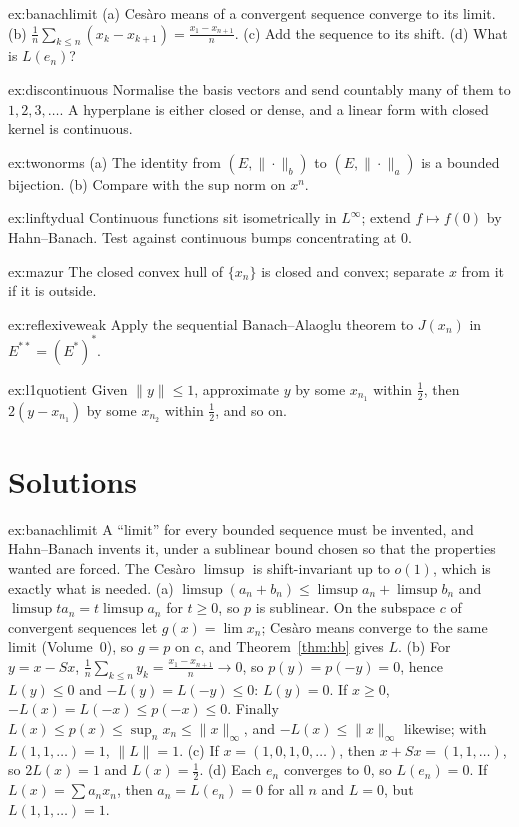 \begin{hint}{ex:banachlimit}
(a) Ces\`aro means of a convergent sequence converge to its limit. (b) $\frac1n\sum_{k\le n}(x_k-x_{k+1})=\frac{x_1-x_{n+1}}n$. (c) Add the sequence to its shift. (d) What is $L(e_n)$?
\end{hint}
\begin{hint}{ex:discontinuous}
Normalise the basis vectors and send countably many of them to $1,2,3,\dots$. A hyperplane is either closed or dense, and a linear form with closed kernel is continuous.
\end{hint}
\begin{hint}{ex:twonorms}
(a) The identity from $(E,\|\cdot\|_b)$ to $(E,\|\cdot\|_a)$ is a bounded bijection. (b) Compare with the sup norm on $x^n$.
\end{hint}
\begin{hint}{ex:linftydual}
Continuous functions sit isometrically in $L^\infty$; extend $f\mapsto f(0)$ by Hahn--Banach. Test against continuous bumps concentrating at $0$.
\end{hint}
\begin{hint}{ex:mazur}
The closed convex hull of $\{x_n\}$ is closed and convex; separate $x$ from it if it is outside.
\end{hint}
\begin{hint}{ex:reflexiveweak}
Apply the sequential Banach--Alaoglu theorem to $J(x_n)$ in $E^{**}=(E^*)^*$.
\end{hint}
\begin{hint}{ex:l1quotient}
Given $\|y\|\le1$, approximate $y$ by some $x_{n_1}$ within $\frac12$, then $2(y-x_{n_1})$ by some $x_{n_2}$ within $\frac12$, and so on.
\end{hint}

\section{Solutions}

\begin{solution}{ex:banachlimit}
\idea A ``limit'' for every bounded sequence must be invented, and Hahn--Banach invents it, under a sublinear bound chosen so that the properties wanted are forced. The Ces\`aro $\limsup$ is shift-invariant up to $o(1)$, which is
exactly what is needed.
\writeup (a) $\limsup(a_n+b_n)\le\limsup a_n+\limsup b_n$ and $\limsup ta_n=t\limsup a_n$ for $t\ge0$, so $p$ is sublinear. On the subspace $c$ of convergent sequences let $g(x)=\lim x_n$; Ces\`aro means converge to the same
limit (Volume~0), so $g=p$ on $c$, and Theorem~\ref{thm:hb} gives $L$. (b) For $y=x-Sx$, $\frac1n\sum_{k\le n}y_k=\frac{x_1-x_{n+1}}n\to0$, so $p(y)=p(-y)=0$, hence $L(y)\le0$ and $-L(y)=L(-y)\le0$: $L(y)=0$. If $x\ge0$,
$-L(x)=L(-x)\le p(-x)\le0$. Finally $L(x)\le p(x)\le\sup_nx_n\le\|x\|_\infty$, and $-L(x)\le\|x\|_\infty$ likewise; with $L(1,1,\dots)=1$, $\|L\|=1$. (c) If $x=(1,0,1,0,\dots)$, then $x+Sx=(1,1,\dots)$, so $2L(x)=1$
and $L(x)=\frac12$. (d) Each $e_n$ converges to $0$, so $L(e_n)=0$. If $L(x)=\sum a_nx_n$, then $a_n=L(e_n)=0$ for all $n$ and $L=0$, but $L(1,1,\dots)=1$.
\end{solution}

